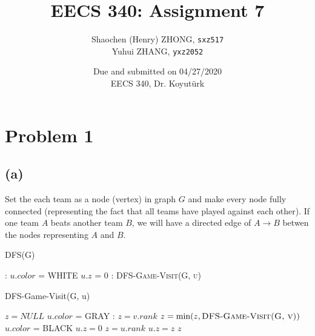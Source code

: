 \documentclass[11pt]{article}
\newcommand{\ilc}{\texttt}
\begin{document}
\title{\textbf{EECS 340: Assignment 7}}

\author{Shaochen (Henry) ZHONG, \ilc{sxz517} \\ Yuhui ZHANG, \ilc{yxz2052}}
\date{Due and submitted on 04/27/2020 \\ EECS 340, Dr. Koyut{\"u}rk}
\maketitle

\section{Problem 1}

\subsection{(a)}

Set the each team as a node (vertex) in graph $G$ and make every node fully connected (representing the fact that all teams have played against each other). If one team $A$ beats another team $B$, we will have a directed edge of $A \rightarrow B$ betwen the nodes representing $A$ and $B$.

\begin{algorithm}[H]
\caption{DFS(G)}
    \begin{algorithmic}[1]
        :
            \State $u.color$ = WHITE
            \State $u.z$ = 0
        \EndFor
        :
                \State \textsc{DFS-Game-Visit(G, u)}
            \EndIf
        \EndFor
    \end{algorithmic}
\end{algorithm}

\begin{algorithm}[H]
\caption{DFS-Game-Visit(G, u)}
    \begin{algorithmic}[1]
        \State $z = NULL$
        \State $u.color$ = GRAY
        :
                \State $z = v.rank$
                \State $z = \min(z, \textsc{DFS-Game-Visit(G, v)})$
            \EndIf
        \EndFor
        \State $u.color$ = BLACK
            \State $u.z = 0$
            \State $z = u.rank$
        \Else
            \State $u.z = z$
        \EndIf
        \State \Return $z$
    \end{algorithmic}
\end{algorithm}
\end{document}
